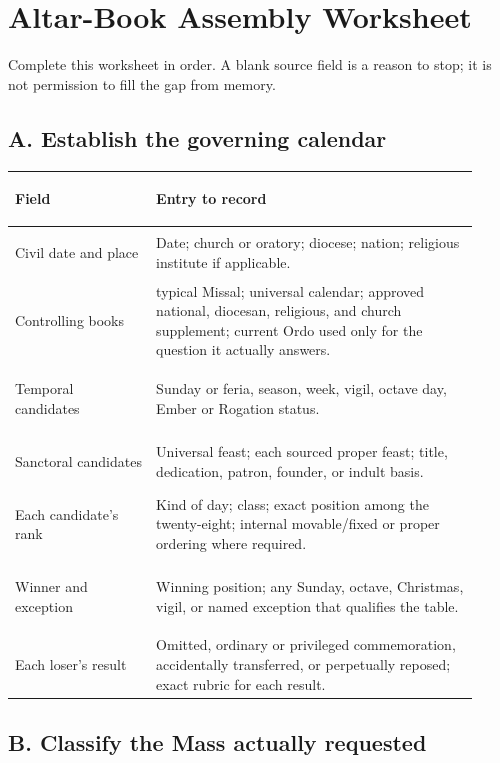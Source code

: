 \section{Altar-Book Assembly Worksheet}
\label{sec:worksheet}

Complete this worksheet in order.  A blank source field is a reason to stop; it is not permission to fill the gap from memory.

\subsection{A. Establish the governing calendar}

\begin{longtable}{>{\bfseries\raggedright\arraybackslash}p{0.28\linewidth}>{\raggedright\arraybackslash}p{0.64\linewidth}}
\toprule
Field & Entry to record\\
\midrule
\endhead
Civil date and place & Date; church or oratory; diocese; nation; religious institute if applicable.\\
Controlling books & 1962 typical Missal; universal calendar; approved national, diocesan, religious, and church supplement; current Ordo used only for the question it actually answers.\\
Temporal candidates & Sunday or feria, season, week, vigil, octave day, Ember or Rogation status.\\
Sanctoral candidates & Universal feast; each sourced proper feast; title, dedication, patron, founder, or indult basis.\\
Each candidate's rank & Kind of day; class; exact position among the twenty-eight; internal movable/fixed or proper ordering where required.\\
Winner and exception & Winning position; any Sunday, octave, Christmas, vigil, or named exception that qualifies the table.\\
Each loser's result & Omitted, ordinary or privileged commemoration, accidentally transferred, or perpetually reposed; exact rubric for each result.\\
\bottomrule
\end{longtable}

\subsection{B. Classify the Mass actually requested}

